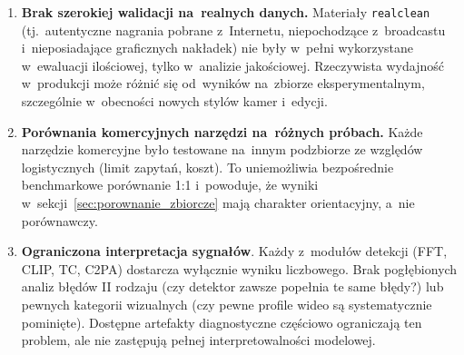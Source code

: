 \begin{enumerate}
  \item \textbf{Brak szerokiej walidacji na~realnych danych.}
    Materiały \texttt{realclean} (tj.\ autentyczne nagrania pobrane z~Internetu, niepochodzące z~broadcastu i~nieposiadające graficznych nakładek)
    nie były w~pełni wykorzystane w~ewaluacji ilościowej, tylko w~analizie jakościowej.
    Rzeczywista wydajność w~produkcji może różnić się od~wyników na~zbiorze
    eksperymentalnym, szczególnie w~obecności nowych stylów kamer i~edycji.

  \item \textbf{Porównania komercyjnych narzędzi na~różnych próbach.}
    Każde narzędzie komercyjne było testowane na~innym podzbiorze ze względów logistycznych
    (limit zapytań, koszt). To uniemożliwia bezpośrednie benchmarkowe porównanie 1:1
    i~powoduje, że wyniki w~sekcji~\ref{sec:porownanie_zbiorcze}
    mają charakter orientacyjny, a~nie porównawczy.

  \item \textbf{Ograniczona interpretacja sygnałów}. 
    Każdy z~modułów detekcji (FFT, CLIP, TC, C2PA) dostarcza wyłącznie wyniku liczbowego.
    Brak pogłębionych analiz błędów II rodzaju (czy detektor zawsze popełnia te same błędy?)
    lub pewnych kategorii wizualnych (czy pewne profile wideo są systematycznie pominięte).
    Dostępne artefakty diagnostyczne częściowo ograniczają ten problem, ale nie zastępują
    pełnej interpretowalności modelowej.

\end{enumerate}

